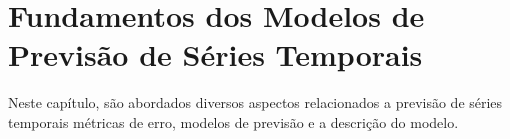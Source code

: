 \section{Fundamentos dos Modelos de Previs\~ao de S\'eries Temporais}\label{sec:base}

 Neste capítulo, são abordados diversos aspectos relacionados a previsão de séries temporais métricas de erro, modelos de previsão e a descrição do modelo. 









%

